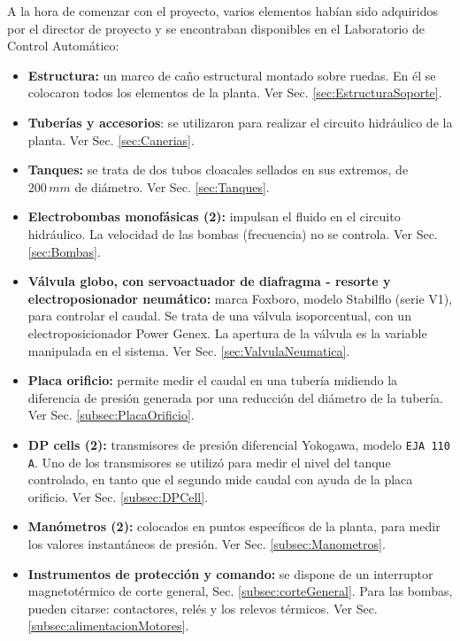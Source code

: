 A la hora de comenzar con el proyecto, varios elementos habían
sido adquiridos por el director de proyecto y se encontraban
disponibles en el Laboratorio de Control Automático:
\begin{itemize}
  \item \textbf{Estructura:} un marco de caño estructural montado sobre
  ruedas. En él se colocaron todos los elementos de la planta.
  Ver Sec. \ref{sec:EstructuraSoporte}.

  \item \textbf{Tuberías y accesorios}: se utilizaron para realizar el
  circuito hidráulico de la planta. Ver Sec. \ref{sec:Canerias}.

  \item \textbf{Tanques:} se trata de dos tubos cloacales sellados en sus
  extremos, de $200\,mm$ de diámetro. Ver Sec. \ref{sec:Tanques}.

  \item \textbf{Electrobombas monofásicas (2):} impulsan el fluido
  en el circuito hidráulico.
  La velocidad de las bombas (frecuencia) no se controla.
  Ver Sec. \ref{sec:Bombas}.

  \item \textbf{Válvula globo, con servoactuador de diafragma - resorte y
electroposionador neumático:} marca Foxboro, modelo
  Stabilflo (serie V1), para controlar el caudal.
  Se trata de una válvula isoporcentual, con un electroposicionador
  Power Genex.
  La apertura de la válvula es la variable manipulada en
  el sistema.
  Ver Sec. \ref{sec:ValvulaNeumatica}.

  \item \textbf{Placa orificio:} permite medir el
  caudal en una tubería midiendo la diferencia de presión generada por una 
  reducción del diámetro de la tubería. Ver Sec. \ref{subsec:PlacaOrificio}.

  \item \textbf{DP cells (2):} transmisores de presión
  diferencial Yokogawa, modelo \verb|EJA 110 A|.
  Uno de los transmisores se utilizó para medir el nivel del tanque
  controlado, en tanto que el segundo mide caudal con ayuda de la placa
  orificio.
  Ver Sec. \ref{subsec:DPCell}.

  \item \textbf{Manómetros (2):} colocados en
  puntos específicos de la planta, para medir los valores instantáneos de
  presión.
  Ver Sec. \ref{subsec:Manometros}.

  \item \textbf{Instrumentos de protección y comando:}
  se dispone de un interruptor magnetotérmico de corte general,
  Sec. \ref{subsec:corteGeneral}.
  Para las bombas, pueden citarse: contactores, relés y los relevos térmicos.
  Ver Sec. \ref{subsec:alimentacionMotores}.


\end{itemize}
